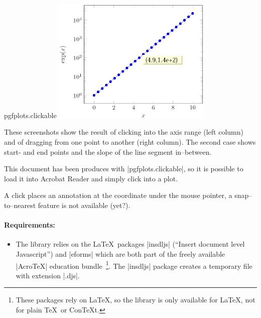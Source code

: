 \begin{tikzlibrary}{pgfplots.clickable}
	\includegraphics[height=6cm]{figures/pgfplotsclickable-fig3.png}
	\hfill

	\nobreak
	These screenshots show the result of clicking into the axis range (left column) and of dragging from one point to another (right column). The second case shows start- and end points and the slope of the line segment in--between.

	This document has been produces with |pgfplots.clickable|, so it is possible to load it into Acrobat Reader and simply click into a plot.

	A click places an annotation at the coordinate under the mouse pointer, a snap--to--nearest feature is not available (yet?).

	\paragraph{Requirements:}
	\begin{itemize}
		\item The library relies on the \LaTeX\ packages |insdljs| (``Insert document level Javascript'') and |eforms| which are both part of the freely available |AcroTeX| education bundle~\cite{acrotex}\footnote{These packages rely on \LaTeX, so the library is only available for \LaTeX, not for plain \TeX\ or Con\TeX t.}. The |insdljs| package creates a temporary file with extension |.djs|.
		

\end{itemize}
\end{tikzlibrary}
